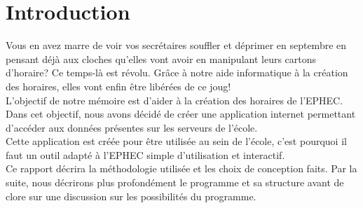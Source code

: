 \section{Introduction}

Vous en avez marre de voir vos secrétaires souffler et déprimer en septembre en pensant déjà aux cloches
 qu'elles vont avoir en manipulant leurs cartons d'horaire? 
Ce temps-là est révolu. Grâce à notre aide informatique à la création des horaires, elles vont enfin être libérées de ce joug!\\

L'objectif de notre mémoire est d'aider à la création des horaires de l'EPHEC.
Dans cet objectif, nous avons décidé de créer une application internet permettant d'accéder
aux données présentes sur les serveurs de l'école.\\

Cette application est créée pour être utilisée au sein de l'école, c'est pourquoi il faut un 
outil adapté à l'EPHEC simple d'utilisation et interactif. \\

Ce rapport décrira la méthodologie utilisée et les choix de conception faits.
Par la suite, nous décrirons plus profondément le programme et sa structure avant de clore sur une discussion sur les possibilités du programme. 



